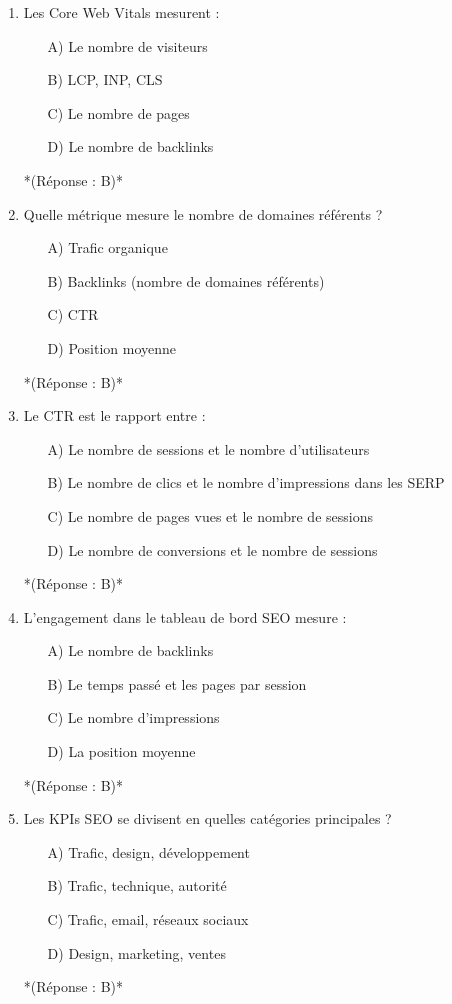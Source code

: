\documentclass[12pt,a4paper,twoside]{report}
\begin{document}
\begin{enumerate}
    \item Les Core Web Vitals mesurent :
    \begin{itemize}
        \item[A)] Le nombre de visiteurs
        \item[B)] LCP, INP, CLS
        \item[C)] Le nombre de pages
        \item[D)] Le nombre de backlinks
    \end{itemize}
    *(Réponse : B)*

    \item Quelle métrique mesure le nombre de domaines référents ?
    \begin{itemize}
        \item[A)] Trafic organique
        \item[B)] Backlinks (nombre de domaines référents)
        \item[C)] CTR
        \item[D)] Position moyenne
    \end{itemize}
    *(Réponse : B)*

    \item Le CTR est le rapport entre :
    \begin{itemize}
        \item[A)] Le nombre de sessions et le nombre d'utilisateurs
        \item[B)] Le nombre de clics et le nombre d'impressions dans les SERP
        \item[C)] Le nombre de pages vues et le nombre de sessions
        \item[D)] Le nombre de conversions et le nombre de sessions
    \end{itemize}
    *(Réponse : B)*

    \item L'engagement dans le tableau de bord SEO mesure :
    \begin{itemize}
        \item[A)] Le nombre de backlinks
        \item[B)] Le temps passé et les pages par session
        \item[C)] Le nombre d'impressions
        \item[D)] La position moyenne
    \end{itemize}
    *(Réponse : B)*

    \item Les KPIs SEO se divisent en quelles catégories principales ?
    \begin{itemize}
        \item[A)] Trafic, design, développement
        \item[B)] Trafic, technique, autorité
        \item[C)] Trafic, email, réseaux sociaux
        \item[D)] Design, marketing, ventes
    \end{itemize}
    *(Réponse : B)*


\end{enumerate}
\end{document}
